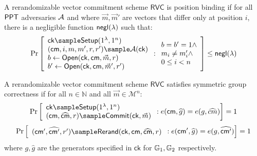 \begin{definition}
A rerandomizable vector commitment scheme $\mathsf{RVC}$ is position binding if for all $\mathsf{PPT}$ adversaries $\mathcal{A}$ and where $\vec{m}, \vec{m}'$ are vectors that differ only at position $i$, there is a negligible function ${\mathsf{negl}(\lambda)}$ such that:
\[
    \Pr
    \left[
        \begin{array}{l}
        \mathsf{ck} \sample \mathsf{Setup}(1^\lambda, 1^n) \\
        (\cm, i, m, m', r, r') \sample \mathcal{A}(\mathsf{ck}) \\
        b \gets \mathsf{Open}(\mathsf{ck}, \cm, \vec{m}, r) \\
        b' \gets \mathsf{Open}(\mathsf{ck}, \cm, \vec{m}', r') \\
        \end{array}
        : \begin{array}{l}
            b = b' = 1 \land \\
            m_i \neq m'_i \land \\
            0 \leq i < n
          \end{array}
    \right] \leq \negl
\]
\end{definition}



\begin{definition}
A rerandomizable vector commitment scheme $\mathsf{RVC}$ satisfies symmetric group correctness if for all $n \in \mathbb{N}$ and all $\vec{m} \in \mathcal{M}^n$:
  \[
        \Pr\left[
        \begin{array}{l}
            \mathsf{ck} \sample \mathsf{Setup}(1^\lambda, 1^n) \\
            (\cm, \widehat{\cm}, r) \sample \mathsf{Commit}(\mathsf{ck}, \vec{m})
        \end{array}
        : e(\cm, \widehat{g}) = e(g, \widehat{cm})
        \right] = 1
    \]
    \[
        \Pr\left[
        \begin{array}{l}
            (\cm', \widehat{\cm'}, r') \sample \mathsf{Rerand}(\mathsf{ck}, \cm, \widehat{\cm}, r)
        \end{array}
        : e(\cm', \widehat{g}) = e(g, \widehat{\cm'})
        \right] = 1
    \]
\noindent where $g, \widehat{g}$ are the generators specified in $\mathsf{ck}$ for $\mathbb{G}_1, \mathbb{G}_2$ respectively.
\end{definition}




